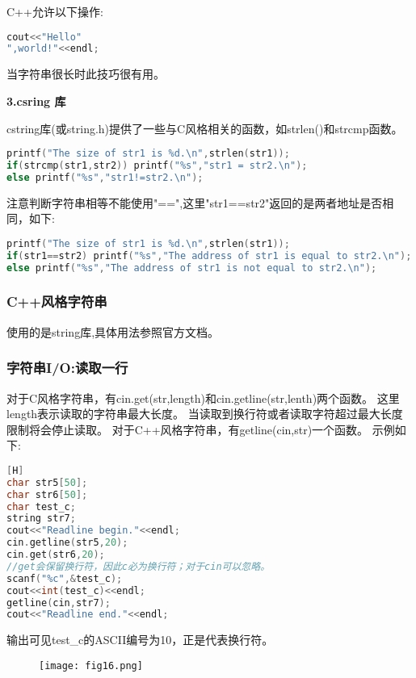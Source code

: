 \documentclass{article}
\begin{document}
    C++允许以下操作:
    \begin{lstlisting}[language=c++]
cout<<"Hello"
",world!"<<endl;
    \end{lstlisting}
    当字符串很长时此技巧很有用。

    \textbf{3.csring 库}
    
    cstring库(或string.h)提供了一些与C风格相关的函数，如strlen()和strcmp函数。
    \begin{lstlisting}[language=c++]
printf("The size of str1 is %d.\n",strlen(str1));
if(strcmp(str1,str2)) printf("%s","str1 = str2.\n");
else printf("%s","str1!=str2.\n");
    \end{lstlisting}
    注意判断字符串相等不能使用"==",这里"str1==str2"返回的是两者地址是否相同，如下:
    \begin{lstlisting}[language=c++]
printf("The size of str1 is %d.\n",strlen(str1));
if(str1==str2) printf("%s","The address of str1 is equal to str2.\n");
else printf("%s","The address of str1 is not equal to str2.\n");
    \end{lstlisting}

    \subsubsection{C++风格字符串}
    使用的是string库,具体用法参照官方文档。

    \subsubsection{字符串I/O:读取一行}
    对于C风格字符串，有cin.get(str,length)和cin.getline(str,lenth)两个函数。
    这里length表示读取的字符串最大长度。
    当读取到换行符或者读取字符超过最大长度限制将会停止读取。
    对于C++风格字符串，有getline(cin,str)一个函数。
    示例如下:
    \begin{lstlisting}[language=c++][H]
char str5[50];
char str6[50];
char test_c;
string str7;
cout<<"Readline begin."<<endl;
cin.getline(str5,20);
cin.get(str6,20);
//get会保留换行符，因此c必为换行符；对于cin可以忽略。
scanf("%c",&test_c);
cout<<int(test_c)<<endl;
getline(cin,str7);
cout<<"Readline end."<<endl;
    \end{lstlisting}
    输出可见test\_c的ASCII编号为10，正是代表换行符。
    \begin{figure}[H]
        \centering
        \texttt{[image: fig16.png]}
    \end{figure}
\end{document}
